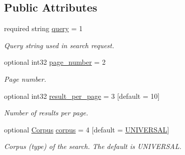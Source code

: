 \subsection*{Public Attributes}
\begin{DoxyCompactItemize}
\item 
required string \hyperlink{structSearchRequest_a61b03a341342b2682ed562dc3a30e652}{query} = 1\hypertarget{structSearchRequest_a61b03a341342b2682ed562dc3a30e652}{}\label{structSearchRequest_a61b03a341342b2682ed562dc3a30e652}

\begin{DoxyCompactList}\small\item\em Query string used in search request. \end{DoxyCompactList}\item 
optional int32 \hyperlink{structSearchRequest_ad4b7d438eba45e2e9ace33c6cbee2969}{page\+\_\+number} = 2\hypertarget{structSearchRequest_ad4b7d438eba45e2e9ace33c6cbee2969}{}\label{structSearchRequest_ad4b7d438eba45e2e9ace33c6cbee2969}

\begin{DoxyCompactList}\small\item\em Page number. \end{DoxyCompactList}\item 
optional int32 \hyperlink{structSearchRequest_a40e02a2779af41f8bf5f7127665bd1a8}{result\+\_\+per\+\_\+page} = 3 \mbox{[}default = 10\mbox{]}
\begin{DoxyCompactList}\small\item\em Number of results per page. \end{DoxyCompactList}\item 
optional \hyperlink{structSearchRequest_ac8fbf72607c24a8ebaee257fec80e7fa}{Corpus} \hyperlink{structSearchRequest_afca1e4b2da346600c363a3ebccb5b798}{corpus} = 4 \mbox{[}default = \hyperlink{structSearchRequest_ac8fbf72607c24a8ebaee257fec80e7faa346efe3e28f260dfbd38522f0d02da04}{U\+N\+I\+V\+E\+R\+S\+AL}\mbox{]}\hypertarget{structSearchRequest_afca1e4b2da346600c363a3ebccb5b798}{}\label{structSearchRequest_afca1e4b2da346600c363a3ebccb5b798}

\begin{DoxyCompactList}\small\item\em Corpus (type) of the search. The default is \textquotesingle{}U\+N\+I\+V\+E\+R\+S\+AL\textquotesingle{}. \end{DoxyCompactList}\end{DoxyCompactItemize}


